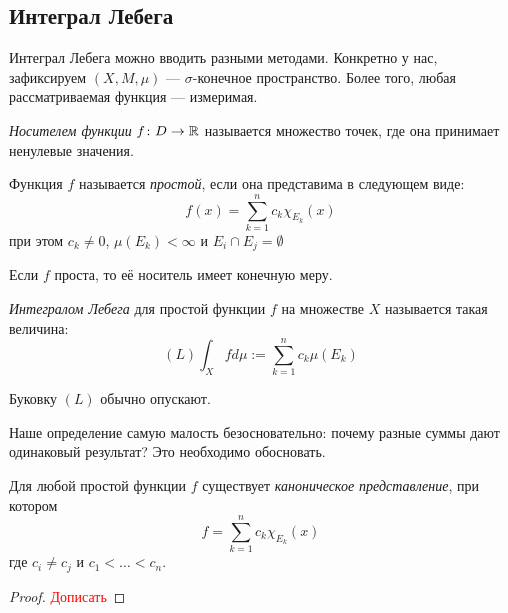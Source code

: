 \subsection{Интеграл Лебега}

\begin{note}
	Интеграл Лебега можно вводить разными методами. Конкретно у нас, зафиксируем $(X, M, \mu)$ --- $\sigma$-конечное пространство. Более того, любая рассматриваемая функция --- измеримая.
\end{note}

\begin{definition}
	\textit{Носителем функции} $f \colon D \to \mathbb{R}$ называется множество точек, где она принимает ненулевые значения.
\end{definition}

\begin{definition}
	Функция $f$ называется \textit{простой}, если она представима в следующем виде:
	\[
		f(x) = \sum_{k = 1}^n c_k \chi_{E_k} (x)
	\]
	при этом $c_k \neq 0$, $\mu(E_k) < \infty$ и $E_i \cap E_j = \emptyset$
\end{definition}

\begin{note}
	Если $f$ проста, то её носитель имеет конечную меру.
\end{note}

\begin{definition}
	\textit{Интегралом Лебега} для простой функции $f$ на множестве $X$ называется такая величина:
	\[
		(L)\int_X fd\mu := \sum_{k = 1}^n c_k \mu(E_k)
	\]
\end{definition}

\begin{note}
	Буковку $(L)$ обычно опускают.
\end{note}

\begin{note}
	Наше определение самую малость безосновательно: почему разные суммы дают одинаковый результат? Это необходимо обосновать.
\end{note}

\begin{lemma}
	Для любой простой функции $f$ существует \textit{каноническое представление}, при котором
	\[
		f = \sum_{k = 1}^n c_k \chi_{E_k}(x)
	\]
	где $c_i \neq c_j$ и $c_1 < \ldots < c_n$.
\end{lemma}

\begin{proof}
	\textcolor{red}{Дописать}
\end{proof}

